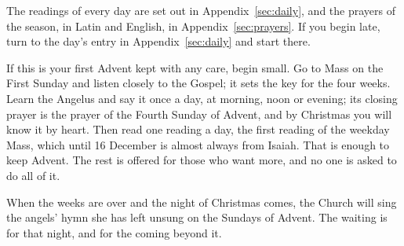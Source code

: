 The readings of every day are set out in Appendix~\ref{sec:daily}, and the
prayers of the season, in Latin and English, in Appendix~\ref{sec:prayers}. If
you begin late, turn to the day's entry in Appendix~\ref{sec:daily} and start
there.

If this is your first Advent kept with any care, begin small. Go to Mass on the
First Sunday and listen closely to the Gospel; it sets the key for the four
weeks. Learn the Angelus and say it once a day, at morning, noon or evening; its
closing prayer is the prayer of the Fourth Sunday of Advent, and by Christmas
you will know it by heart. Then read one reading a day, the first reading of the
weekday Mass, which until 16 December is almost always from Isaiah. That is
enough to keep Advent. The rest is offered for those who want more, and no one
is asked to do all of it.

When the weeks are over and the night of Christmas comes, the Church will sing
the angels' hymn she has left unsung on the Sundays of Advent. The waiting is
for that night, and for the coming beyond it.
